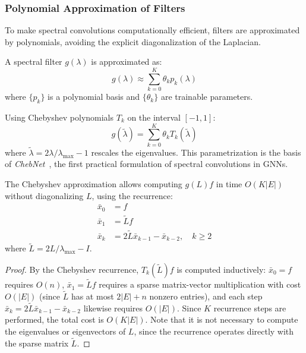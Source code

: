\subsubsection{Polynomial Approximation of Filters}

To make spectral convolutions computationally efficient, filters are approximated by polynomials, avoiding the explicit diagonalization of the Laplacian.

\begin{definition}\label{def:filtros_polinomiales}
A spectral filter $g(\lambda)$ is approximated as:
\begin{equation}
g(\lambda) \approx \sum_{k=0}^K \theta_k p_k(\lambda)
\end{equation}
where $\{p_k\}$ is a polynomial basis and $\{\theta_k\}$ are trainable parameters.
\end{definition}

\begin{example}\label{ex:chebyshev_aproximacion}
Using Chebyshev polynomials $T_k$ on the interval $[-1, 1]$:
\begin{equation}
g(\tilde{\lambda}) = \sum_{k=0}^K \theta_k T_k(\tilde{\lambda})
\end{equation}
where $\tilde{\lambda} = 2\lambda/\lambda_{\max} - 1$ rescales the eigenvalues. This parametrization is the basis of \textit{ChebNet}~\citep{defferrard2017convolutionalneuralnetworksgraphs}, the first practical formulation of spectral convolutions in \glspl{GNN}.
\end{example}

\begin{theorem}\label{thm:eficiencia_chebyshev}
The Chebyshev approximation allows computing $g(L)f$ in time $O(K|E|)$ without diagonalizing $L$, using the recurrence:
\begin{align}
\bar{x}_0 &= f \\
\bar{x}_1 &= \tilde{L} f \\
\bar{x}_k &= 2\tilde{L}\bar{x}_{k-1} - \bar{x}_{k-2}, \quad k \geq 2
\end{align}
where $\tilde{L} = 2L/\lambda_{\max} - I$.
\end{theorem}

\begin{proof}
By the Chebyshev recurrence, $T_k(\tilde{L})f$ is computed inductively: $\bar{x}_0 = f$ requires $O(n)$, $\bar{x}_1 = \tilde{L}f$ requires a sparse matrix-vector multiplication with cost $O(|E|)$ (since $\tilde{L}$ has at most $2|E| + n$ nonzero entries), and each step $\bar{x}_k = 2\tilde{L}\bar{x}_{k-1} - \bar{x}_{k-2}$ likewise requires $O(|E|)$. Since $K$ recurrence steps are performed, the total cost is $O(K|E|)$. Note that it is not necessary to compute the eigenvalues or eigenvectors of $L$, since the recurrence operates directly with the sparse matrix $\tilde{L}$.
\end{proof}

